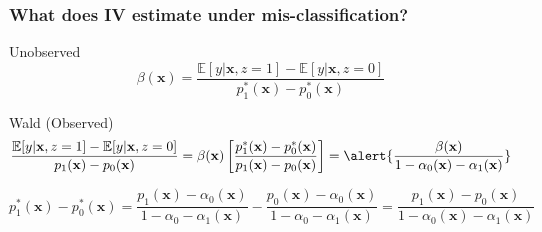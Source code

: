 \documentclass[handout]{beamer}
\begin{document}
\begin{frame}
  \frametitle{What does IV estimate under mis-classification?}
  \begin{block}{Unobserved}
  \[
    \beta(\mathbf{x}) = \frac{\mathbb{E}[y|\mathbf{x},z=1] - \mathbb{E}[y|\mathbf{x},z=0]}{p^*_1(\mathbf{x}) - p^*_0(\mathbf{x})} 
  \]
  \end{block}

  \begin{block}{Wald (Observed)}
    \vspace{-1em}
    \small
    \[
      \frac{\mathbb{E}[y|\mathbf{x},z=1] - \mathbb{E}[y|\mathbf{x},z=0]}{p_1(\mathbf{x}) - p_0(\mathbf{x})} = \beta(\mathbf{x})\left[ \frac{p_1^*(\mathbf{x}) - p_0^*(\mathbf{x})}{p_1(\mathbf{x}) - p_0(\mathbf{x})} \right] = \alert{\frac{\beta(\mathbf{x})}{1 - \alpha_0(\mathbf{x}) - \alpha_1(\mathbf{x})} }
    \]
   
    \vspace{2em}
    \scriptsize
    \[
      \boxed{p_1^*(\mathbf{x}) - p_0^*(\mathbf{x}) = \frac{p_1(\mathbf{x}) - \alpha_0(\mathbf{x})}{1 - \alpha_0 - \alpha_1(\mathbf{x})} -   \frac{p_0(\mathbf{x}) - \alpha_0(\mathbf{x})}{1 - \alpha_0 - \alpha_1(\mathbf{x})} = \frac{p_1(\mathbf{x}) - p_0(\mathbf{x})}{1 - \alpha_0(\mathbf{x}) - \alpha_1(\mathbf{x})}}
    \]
  \end{block}
\end{frame}
%
%
%
%
%
\end{document}
